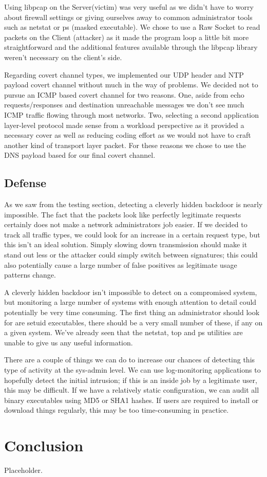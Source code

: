 \documentclass[titlepage]{article}
\begin{document}
Using libpcap on the Server(victim) was very useful as we didn't have to worry about firewall settings or giving ourselves away to common administrator tools such as netstat or ps (masked executable).  We chose to use a Raw Socket to read packets on the Client (attacker) as it made the program loop a little bit more straightforward and the additional features available through the libpcap library weren't necessary on the client's side.

Regarding covert channel types, we implemented our UDP header and NTP payload covert channel without much in the way of problems.  We decided not to pursue an ICMP based covert channel for two reasons. One, aside from echo requests/responses and destination unreachable messages we don't see much ICMP traffic flowing through most networks. Two, selecting a second application layer-level protocol made sense from a workload perspective as it provided a necessary cover as well as reducing coding effort as we would not have to craft another kind of transport layer packet.  For these reasons we chose to use the DNS payload based for our final covert channel.

\subsection{Defense}

As we saw from the testing section, detecting a cleverly hidden backdoor is nearly impossible.  The fact that the packets look like perfectly legitimate requests certainly does not make a network administrators job easier. If we decided to track all traffic types, we could look for an increase in a certain request type, but this isn't an ideal solution. Simply slowing down transmission should make it stand out less or the attacker could simply switch between signatures; this could also potentially cause a large number of false positives as legitimate usage patterns change.

A cleverly hidden backdoor isn't impossible to detect on a compromised system, but monitoring a large number of systems with enough attention to detail could potentially be very time consuming.  The first thing an administrator should look for are setuid executables, there should be a very small number of these, if any on a given system.  We've already seen that the netstat, top and ps utilities are unable to give us any useful information. 

There are a couple of things we can do to increase our chances of detecting this type of activity at the sys-admin level. We can use log-monitoring applications to hopefully detect the initial intrusion; if this is an inside job by a legitimate user, this may be difficult.  If we have a relatively static configuration, we can audit all binary executables using MD5 or SHA1 hashes. If users are required to install or download things regularly, this may be too time-consuming in practice.

\section{Conclusion}

Placeholder.
\end{document}
